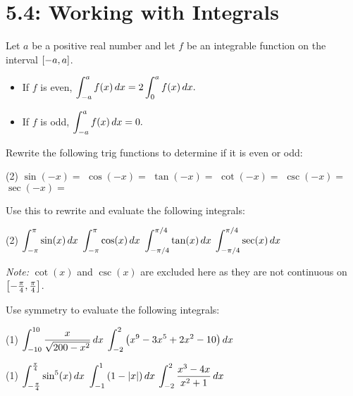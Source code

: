 \documentclass[../mathNotesPreamble]{subfiles}
\begin{document}
\section{5.4: Working with Integrals}

\begin{thmBox*}
  Let $a$ be a positive real number and let $f$ be an integrable function on the interval ${\left[-a,a\right]}$.
  \begin{itemize}
    \item If $f$ is even, $\displaystyle\int_{-a}^a f(x)\,dx=2\int_{0}^a f(x)\,dx.$
    \item If $f$ is odd, $\displaystyle\int_{-a}^a f(x)\,dx=0.$
  \end{itemize}
\end{thmBox*}

\begin{ex*}
  Rewrite the following trig functions to determine if it is even or odd:
  \begin{tasks}[label=\mbox{}](2)
    \task $\sin(-x)=$
    \task $\cos(-x)=$
    \task $\tan(-x)=$
    \task $\cot(-x)=$
    \task $\csc(-x)=$
    \task $\sec(-x)=$
  \end{tasks}
  Use this to rewrite and evaluate the following integrals:
\end{ex*}
\begin{tasks}[after-item-skip=\stretch{1}, label=\mbox{}](2)
  \task $\displaystyle\int_{-\pi}^\pi \sin(x)\,dx$
  \task $\displaystyle\int_{-\pi}^\pi \cos(x)\,dx$
  \task $\displaystyle\int_{-\pi/4}^{\pi/4} \tan(x)\,dx$
  \task $\displaystyle\int_{-\pi/4}^{\pi/4} \sec(x)\,dx$
\end{tasks}
\textit{Note:} $\cot(x)$ and $\csc(x)$ are excluded here as they are not continuous on ${\left[-\frac{\pi}{4},\frac{\pi}{4}\right]}$.

\vspace*{-\baselineskip}
\pagebreak

\begin{ex*}
  Use symmetry to evaluate the following integrals:
\end{ex*}
\begin{tasks}[after-item-skip=\stretch{1}](1)
  \task $\displaystyle\int_{-10}^{10} \frac{x}{\sqrt{200-x^2}}\,dx$
  \task $\displaystyle\int_{-2}^{2}{\left(x^9-3x^5+2x^2-10\right)}\,dx$
\end{tasks}
\pagebreak

\begin{tasks}[after-item-skip=\stretch{1}, resume](1)
  \task $\displaystyle\int_{-\frac{\pi}{4}}^{\frac{\pi}{4}}\sin^5(x)\,dx$
  \task $\displaystyle\int_{-1}^{1}{\left(1-{\left\vert x\right\vert}\right)}\,dx$
  \task $\displaystyle\int_{-2}^{2}\frac{x^3-4x}{x^2+1}\,dx$
\end{tasks}
\pagebreak
\end{document}
